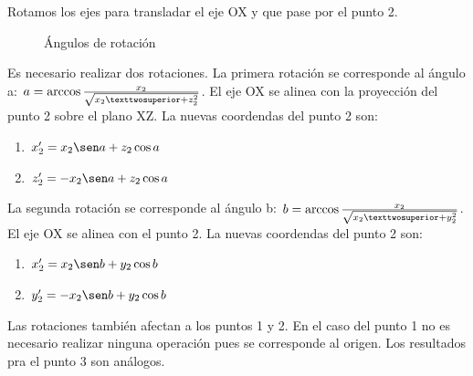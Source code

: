 Rotamos los ejes para transladar el eje OX y que pase por el punto 2.

\begin{figure}[h!]
	\begin{center}
     	\end{center}
    	\caption{Ángulos de rotación}\label{fig:triang3}
\end{figure}

Es necesario realizar dos rotaciones. La primera rotación se corresponde al ángulo a: $a = \arccos {x_2 \over {\sqrt{x_2²+z_2^2}}}$. El eje OX se alinea con la proyección del punto 2 sobre el plano XZ. La nuevas coordendas del punto 2 son:

\begin{enumerate}
\item $x_2' = x_2 \sen a + z_2 \cos a$
\item $z_2' = - x_2 \sen a + z_2 \cos a$
\end{enumerate}

La segunda rotación se corresponde al ángulo b: $b = \arccos {x_2 \over {\sqrt{x_2²+y_2^2}}}$. El eje OX se alinea con el punto 2. La nuevas coordendas del punto 2 son:

\begin{enumerate}
\item $x_2' = x_2 \sen b + y_2 \cos b$
\item $y_2' = - x_2 \sen b + y_2 \cos b$
\end{enumerate}

Las rotaciones también afectan a los puntos 1 y 2. En el caso del punto 1 no es necesario realizar ninguna operación pues se corresponde al origen. Los resultados pra el punto 3 son análogos. \newline

